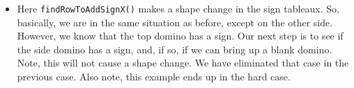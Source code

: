 \documentclass[12pt]{article}
\numberwithin{equation}{section}
\newcommand{\horizontalDominoRSShift}[4]{\filldraw [dominoRSStyle] (#2 - 1 + #4 + \eps, #1 - 1 + \eps) rectangle + (2 - \teps, 1 -\teps) node [dominoText] {$#3$};}
\begin{document}
\begin{itemize}
\begin{itemize}
\begin{itemize}
\begin{itemize}
\begin{figure}[H]
          \end{figure}

          \item Here \texttt{findRowToAddSignX()} makes a shape change in the sign tableaux.
          So, basically, we are in the same situation as before, except on the other side.
          However, we know that the top domino has a sign.
          Our next step is to see if the side domino has a sign, and, if so, if we can bring up a blank domino.
          Note, this will not cause a shape change.
          We have eliminated that case in the previous case.
          Also note, this example ends up in the hard case.
          \begin{figure}[H]
            \centering
\end{figure}
\end{itemize}
\end{itemize}
\end{itemize}
\end{itemize}
\end{document}
